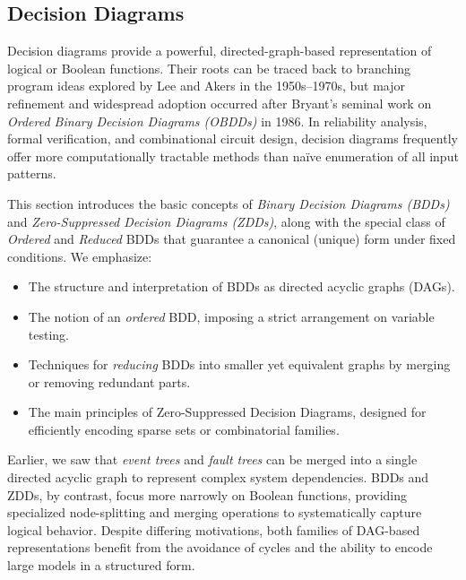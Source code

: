 \subsection{Decision Diagrams}
\label{sec:decision_diagrams}

Decision diagrams provide a powerful, directed-graph-based representation of logical or Boolean functions. Their roots can be traced back to branching program ideas explored by Lee and Akers in the 1950s--1970s, but major refinement and widespread adoption occurred after Bryant's seminal work on \emph{Ordered Binary Decision Diagrams (OBDDs)} in 1986. In reliability analysis, formal verification, and combinational circuit design, decision diagrams frequently offer more computationally tractable methods than naïve enumeration of all input patterns.

This section introduces the basic concepts of \emph{Binary Decision Diagrams (BDDs)} and \emph{Zero-Suppressed Decision Diagrams (ZDDs)}, along with the special class of \emph{Ordered} and \emph{Reduced} BDDs that guarantee a canonical (unique) form under fixed conditions. We emphasize:
\begin{itemize}
\item The structure and interpretation of BDDs as directed acyclic graphs (DAGs).
\item The notion of an \emph{ordered} BDD, imposing a strict arrangement on variable testing.
\item Techniques for \emph{reducing} BDDs into smaller yet equivalent graphs by merging or removing redundant parts.
\item The main principles of Zero-Suppressed Decision Diagrams, designed for efficiently encoding sparse sets or combinatorial families.
\end{itemize}

Earlier, we saw that \emph{event trees} and \emph{fault trees} can be merged into a single directed acyclic graph to represent complex system dependencies. BDDs and ZDDs, by contrast, focus more narrowly on Boolean functions, providing specialized node-splitting and merging operations to systematically capture logical behavior. Despite differing motivations, both families of DAG-based representations benefit from the avoidance of cycles and the ability to encode large models in a structured form.





